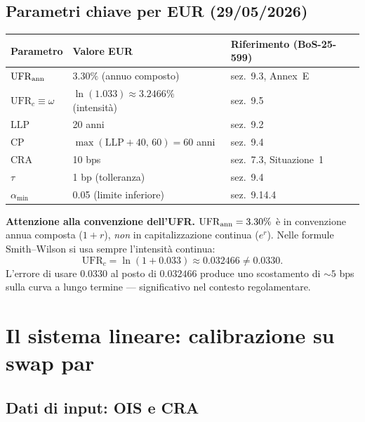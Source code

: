 \documentclass[11pt,a4paper]{article}
\theoremstyle{plain}
\theoremstyle{definition}
\theoremstyle{remark}
\newcommand{\UFR}{\mathrm{UFR}}
\newcommand{\LLP}{\mathrm{LLP}}
\newcommand{\CP}{\mathrm{CP}}
\newcommand{\CRA}{\mathrm{CRA}}
\begin{document}
\subsection{Parametri chiave per EUR (29/05/2026)}

\begin{center}
\renewcommand{\arraystretch}{1.25}
\begin{tabular}{lll}
\toprule
\textbf{Parametro} & \textbf{Valore EUR} & \textbf{Riferimento (BoS-25-599)} \\
\midrule
$\UFR_{\rm ann}$ & $3.30\%$ (annuo composto) & sez.~9.3, Annex~E \\
$\UFR_c \equiv \omega$ & $\ln(1.033) \approx 3.2466\%$ (intensità) & sez.~9.5 \\
$\LLP$ & 20 anni & sez.~9.2 \\
$\CP$ & $\max(\LLP+40,\,60) = 60$ anni & sez.~9.4 \\
$\CRA$ & 10 bps & sez.~7.3, Situazione~1 \\
$\tau$ & 1 bp (tolleranza) & sez.~9.4 \\
$\alpha_{\min}$ & 0.05 (limite inferiore) & sez.~9.14.4 \\
\bottomrule
\end{tabular}
\end{center}

\begin{warningbox}
\textbf{Attenzione alla convenzione dell'UFR.}
$\UFR_{\rm ann} = 3.30\%$ \`e in convenzione annua composta ($1+r$), \emph{non}
in capitalizzazione continua ($e^r$). Nelle formule Smith--Wilson si usa
sempre l'intensit\`a continua:
\[
  \UFR_c = \ln(1 + 0.033) \approx 0.032466 \ne 0.0330.
\]
L'errore di usare $0.0330$ al posto di $0.032466$ produce uno scostamento
di $\sim 5$ bps sulla curva a lungo termine --- significativo nel contesto
regolamentare.
\end{warningbox}

\section{Il sistema lineare: calibrazione su swap par}
\label{sec:sistema}

\subsection{Dati di input: OIS e CRA}
\end{document}
